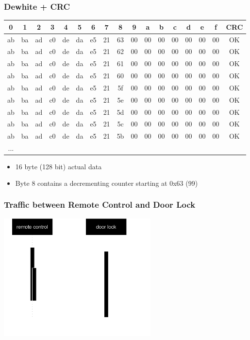 \documentclass[aspectratio=169]{beamer}
\begin{document}
\begin{frame}[fragile]
	\frametitle{Dewhite + CRC}

\begin{scriptsize}
\begin{tabular}{cccccccc>{\columncolor[RGB]{42, 42, 42}}ccccccccc}
0 & 1 & 2 & 3 & 4 & 5 & 6 & 7 & 8 & 9 & a & b & c & d & e & f & CRC\\
\hline
ab & ba & ad & c0 & de & da & e5 & 21 & 63 & 00 & 00 & 00 & 00 & 00 & 00 & 00 & OK\\
ab & ba & ad & c0 & de & da & e5 & 21 & 62 & 00 & 00 & 00 & 00 & 00 & 00 & 00 & OK\\
ab & ba & ad & c0 & de & da & e5 & 21 & 61 & 00 & 00 & 00 & 00 & 00 & 00 & 00 & OK\\
ab & ba & ad & c0 & de & da & e5 & 21 & 60 & 00 & 00 & 00 & 00 & 00 & 00 & 00 & OK\\
ab & ba & ad & c0 & de & da & e5 & 21 & 5f & 00 & 00 & 00 & 00 & 00 & 00 & 00 & OK\\
ab & ba & ad & c0 & de & da & e5 & 21 & 5e & 00 & 00 & 00 & 00 & 00 & 00 & 00 & OK\\
ab & ba & ad & c0 & de & da & e5 & 21 & 5d & 00 & 00 & 00 & 00 & 00 & 00 & 00 & OK\\
ab & ba & ad & c0 & de & da & e5 & 21 & 5c & 00 & 00 & 00 & 00 & 00 & 00 & 00 & OK\\
ab & ba & ad & c0 & de & da & e5 & 21 & 5b & 00 & 00 & 00 & 00 & 00 & 00 & 00 & OK\\
...\\
\end{tabular}
\end{scriptsize}

	\begin{itemize}
		\item 16 byte (128 bit) actual data
		\item Byte 8 contains a decrementing counter starting at 0x63 (99)
	\end{itemize}
\end{frame}

\begin{frame}
	\frametitle{Traffic between Remote Control and Door Lock}

	\begin{center}
		\includegraphics[width=0.6\textwidth]{communication.pdf}
	\end{center}
\end{frame}
\end{document}
